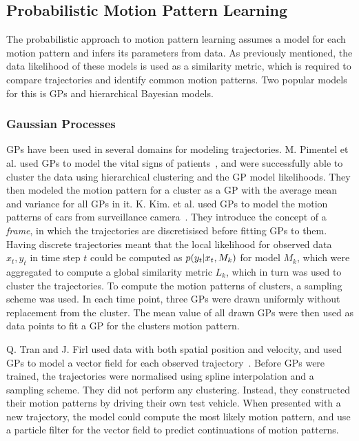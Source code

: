 \subsection{Probabilistic Motion Pattern Learning}
The probabilistic approach to motion pattern learning assumes a model for each motion pattern
and infers its parameters from data. As previously mentioned, the data
likelihood of these models is used as a similarity metric, which
is required to compare trajectories and identify common motion patterns.
Two popular models for this is GPs and hierarchical Bayesian models.

\subsubsection{Gaussian Processes}
GPs have been used in several domains for modeling trajectories.
M. Pimentel et al. used GPs to model the vital signs of patients~\cite{Pimentel2013Sep}, 
and were successfully able to cluster the data using hierarchical clustering
and the GP model likelihoods. They then modeled the motion pattern
for a cluster as a GP with the average mean and variance for all GPs in it.
K. Kim. et al. used GPs to model the motion patterns of cars from
surveillance camera~\cite{Kim2011Nov}. They introduce the
concept of a \textit{frame}, in which the trajectories are
discretisised before fitting GPs to them. Having discrete trajectories meant that
the local likelihood for observed data $x_t, y_t$ in time step $t$
could be computed as $p(y_t | x_t, {M_k})$ for model $M_k$, which
were aggregated to compute a global similarity metric $L_k$,
which in turn was used to cluster the trajectories. To compute the motion
patterns of clusters, a sampling scheme was used. In each time
point, three GPs were drawn uniformly without replacement from the
cluster. The mean value of all drawn GPs were then used as data points
to fit a GP for the clusters motion pattern.

Q. Tran and J. Firl used data with both spatial position and velocity,
and used GPs to model a vector field for each observed
trajectory~\cite{Tran2014Jun}. Before GPs were trained, the trajectories 
were normalised using spline interpolation and a
sampling scheme. They did not perform any clustering. Instead, they
constructed their motion patterns by driving their own test vehicle. 
When presented with a new trajectory, the model could compute the most
likely motion pattern, and use a particle filter for the vector
field to predict continuations of motion patterns. 

